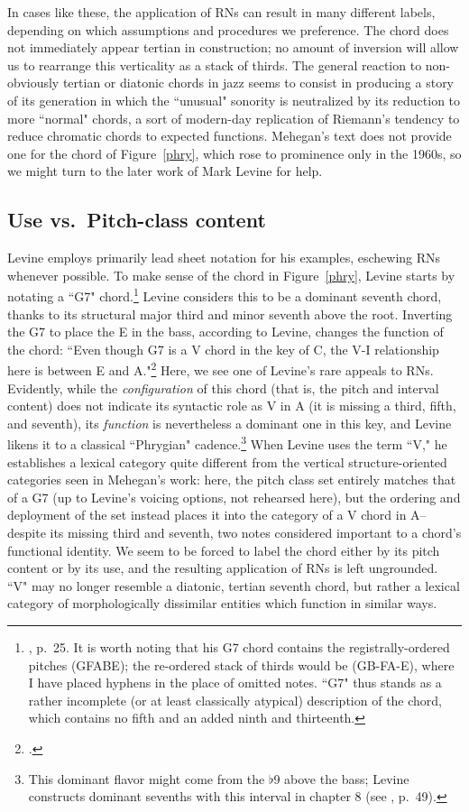 In cases like these, the application of RNs can result in many different labels, depending on which assumptions and procedures we preference.  The chord does not immediately appear tertian in construction; no amount of inversion will allow us to rearrange this verticality as a stack of thirds.  The general reaction to non-obviously tertian or diatonic chords in jazz seems to consist in producing a story of its generation in which the ``unusual" sonority is neutralized by its reduction to more ``normal" chords, a sort of modern-day replication of Riemann's tendency to reduce chromatic chords to expected functions.  Mehegan's text does not provide one for the chord of Figure~\ref{phry}, which rose to prominence only in the 1960s, so we might turn to the later work of Mark Levine for help.

\subsection{Use vs.\ Pitch-class content}
Levine employs primarily lead sheet notation for his examples, eschewing RNs whenever possible.  To make sense of the chord in Figure~\ref{phry}, Levine starts by notating a ``G7" chord.\footnote{\cite{levine1989}, p.\ 25.  It is worth noting that his G7 chord contains the registrally-ordered pitches (GFABE); the re-ordered stack of thirds would be (GB-FA-E), where I have placed hyphens in the place of omitted notes.  ``G7" thus stands as a rather incomplete (or at least classically atypical) description of the chord, which contains no fifth and an added ninth and thirteenth.}  Levine considers this to be a dominant seventh chord, thanks to its structural major third and minor seventh above the root.  Inverting the G7 to place the E in the bass, according to Levine, changes the function of the chord: ``Even though G7 is a V chord in the key of C, the V-I relationship here is between E and A."\footnote{\cite{levine1989}.}  Here, we see one of Levine's rare appeals to RNs.  Evidently, while the \emph{configuration} of this chord (that is, the pitch and interval content) does not indicate its syntactic role as V in A (it is missing a third, fifth, and seventh), its \emph{function} is nevertheless a dominant one in this key, and Levine likens it to a classical ``Phrygian" cadence.\footnote{This dominant flavor might come from the $\flat$9 above the bass; Levine constructs dominant sevenths with this interval in chapter 8 (see \cite{levine1989}, p.\ 49).}  When Levine uses the term ``V," he establishes a lexical category quite different from the vertical structure-oriented categories seen in Mehegan's work: here, the pitch class set entirely matches that of a G7 (up to Levine's voicing options, not rehearsed here), but the ordering and deployment of the set instead places it into the category of a V chord in A-- despite its missing third and seventh, two notes considered important to a chord's functional identity.  We seem to be forced to label the chord either by its pitch content or by its use, and the resulting application of RNs is left ungrounded.  ``V" may no longer resemble a diatonic, tertian seventh chord, but rather a lexical category of morphologically dissimilar entities which function in similar ways.

